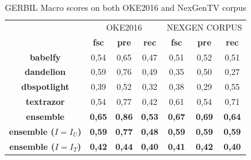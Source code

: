 \documentclass{llncs}
\begin{document}

\begin{table}
      \centering
      \setlength{\tabcolsep}{12pt}
        \begin{tabular}{c|c|c|c|c|c|c|}
          \multicolumn{1}{c}{ } &
          \multicolumn{3}{|c|}{OKE2016} & 
          \multicolumn{3}{|c|}{NEXGEN CORPUS} \\
           \multicolumn{1}{c|}{ } & \textbf{fsc} & \textbf{pre} & \textbf{rec}
           & \textbf{fsc} & \textbf{pre} & \textbf{rec} \\ \hline
            \textbf{babelfy}         & 0,54  & 0,65   & 0,47  & 0,51  & 0,52 & 0,51  \\ \hline
            \textbf{dandelion}       & 0,59   & 0,76   & 0,49 & 0,35  & 0,50  & 0,27 \\ \hline
            \textbf{dbspotlight}     & 0,39   & 0,52   & 0,32 & 0,38   & 0,29  & 0,55  \\ \hline
            \textbf{textrazor}       & 0,54   & 0,77   & 0,42 & 0,61  & 0,54  & 0,71 \\ \hline \hline
            \textbf{ensemble}        & \textbf{0,65}   & \textbf{0,86}   & \textbf{0,53}  & \textbf{0,67} & \textbf{0,69}  & \textbf{0,64} \\ \hline
            \textbf{ensemble ($I=I_U$)}        & \textbf{0,59}   & \textbf{0,77}   & \textbf{0,48}  & \textbf{0,59} & \textbf{0,59}  & \textbf{0,59} \\ \hline
            \textbf{ensemble ($I=I_T$)}        & \textbf{0,42} & \textbf{0,44}  & \textbf{0,40}  & \textbf{0,41} & \textbf{0,42}  & \textbf{0,40} \\ \hline
            
        \end{tabular}
    \caption{GERBIL Macro scores on both OKE2016 and NexGenTV corpus}
    \label{linkscoresmacro}
\end{table}
\end{document}
